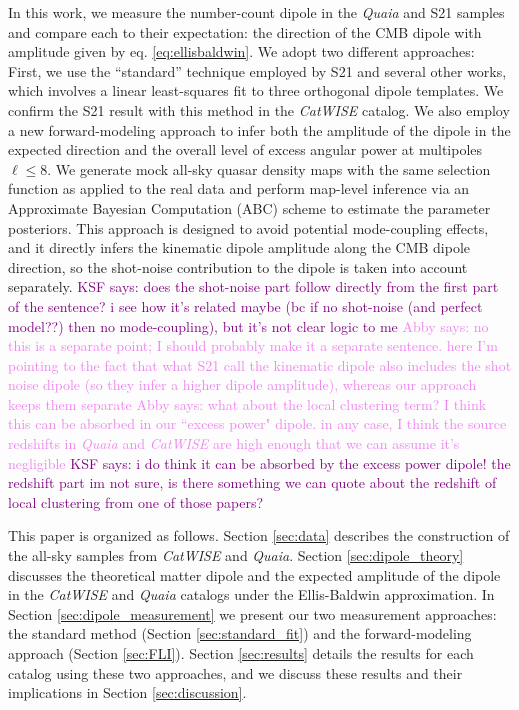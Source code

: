 \documentclass[modern]{aastex631}
\newcommand{\abby}[1]{\textcolor{violet}{Abby says: #1}}
\newcommand{\ksf}[1]{\textcolor{purple}{KSF says: #1}}
\newcommand{\catwise}{\textsl{CatWISE}\xspace}
\newcommand{\quaia}{\textsl{Quaia}\xspace}
\begin{document}
In this work, we measure the number-count dipole in the \quaia and S21 samples and compare each to their expectation: the direction of the CMB dipole with amplitude given by eq. \ref{eq:ellisbaldwin}.
We adopt two different approaches:
First, we use the ``standard'' technique employed by S21 and several other works, which involves a linear least-squares fit to three orthogonal dipole templates.
We confirm the S21 result with this method in the \catwise catalog.
We also employ a new forward-modeling approach to infer both the amplitude of the dipole in the expected direction and the overall level of excess angular power at multipoles $\ell\le 8$.
We generate mock all-sky quasar density maps with the same selection function as applied to the real data and perform map-level inference via an Approximate Bayesian Computation (ABC) scheme to estimate the parameter posteriors.
This approach is designed to avoid potential mode-coupling effects, and it directly infers the kinematic dipole amplitude along the CMB dipole direction, so the shot-noise contribution to the dipole is taken into account separately. 
\ksf{does the shot-noise part follow directly from the first part of the sentence? i see how it's related maybe (bc if no shot-noise (and perfect model??) then no mode-coupling), but it's not clear logic to me} \abby{no this is a separate point; I should probably make it a separate sentence. here I'm pointing to the fact that what S21 call the kinematic dipole also includes the shot noise dipole (so they infer a higher dipole amplitude), whereas our approach keeps them separate}
\abby{what about the local clustering term? I think this can be absorbed in our ``excess power" dipole. in any case, I think the source redshifts in \quaia and \catwise are high enough that we can assume it's negligible}
\ksf{i do think it can be absorbed by the excess power dipole! the redshift part im not sure, is there something we can quote about the redshift of local clustering from one of those papers?}

This paper is organized as follows.
Section \ref{sec:data} describes the construction of the all-sky samples from \catwise and \quaia.
Section \ref{sec:dipole_theory} discusses the theoretical matter dipole and the expected amplitude of the dipole in the \catwise and \quaia catalogs under the Ellis-Baldwin approximation.
In Section \ref{sec:dipole_measurement} we present our two measurement approaches: the standard method (Section \ref{sec:standard_fit}) and the forward-modeling approach (Section \ref{sec:FLI}).
Section \ref{sec:results} details the results for each catalog using these two approaches, and we discuss these results and their implications in Section \ref{sec:discussion}.
\end{document}
